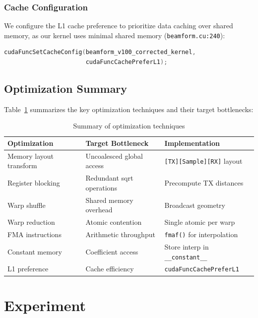 \documentclass{article}
\begin{document}
\subsubsection{Cache Configuration}

We configure the L1 cache preference to prioritize data caching over shared memory, as our kernel uses minimal shared memory (\texttt{beamform.cu:240}):

\begin{lstlisting}[language=C++]
cudaFuncSetCacheConfig(beamform_v100_corrected_kernel,
                       cudaFuncCachePreferL1);
\end{lstlisting}

\subsection{Optimization Summary}

Table~\ref{tab:optimizations} summarizes the key optimization techniques and their target bottlenecks:

\begin{table}[H]
\centering
\small
\begin{tabular}{lll}
\toprule
\textbf{Optimization} & \textbf{Target Bottleneck} & \textbf{Implementation} \\
\midrule
Memory layout transform & Uncoalesced global access & \texttt{[TX][Sample][RX]} layout \\
Register blocking & Redundant sqrt operations & Precompute TX distances \\
Warp shuffle & Shared memory overhead & Broadcast geometry \\
Warp reduction & Atomic contention & Single atomic per warp \\
FMA instructions & Arithmetic throughput & \texttt{fmaf()} for interpolation \\
Constant memory & Coefficient access & Store interp in \texttt{\_\_constant\_\_} \\
L1 preference & Cache efficiency & \texttt{cudaFuncCachePreferL1} \\
\bottomrule
\end{tabular}
\caption{Summary of optimization techniques}
\label{tab:optimizations}
\end{table}

\section{Experiment}
\end{document}
